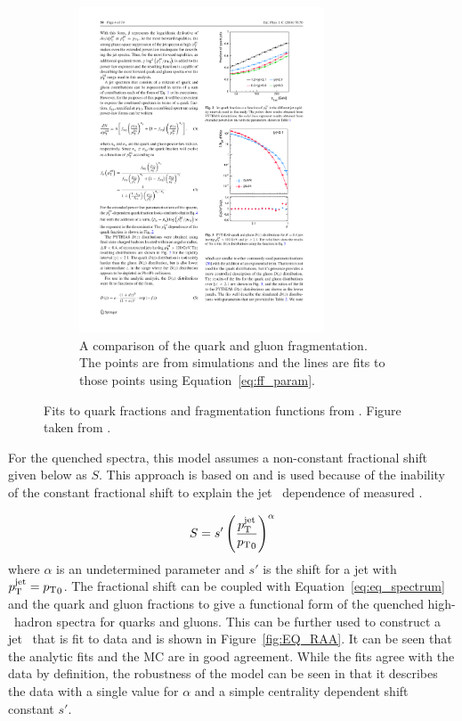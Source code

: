 \begin{figure}
\begin{subfigure}{.45\textwidth}
\includegraphics[width=0.8\textwidth]{figures/jetMeasurements/gluon_fragmentation}
\caption{A comparison of the quark and gluon fragmentation.
The points are from  simulations and the lines are fits to those points using Equation~\ref{eq:ff_param}.}
\label{fig:gluon_fragmentation}
\end{subfigure}
\caption{Fits to quark fractions and fragmentation functions from .
 Figure taken from \cite{Spousta:2015fca}.}
\label{fig:EQ_pp_models}
\end{figure}

For the quenched spectra, this model assumes a non-constant fractional shift given below as $S$.
This approach is based on \cite{baier2001quenching} and is used because of the inability of the constant fractional shift to explain the jet \pt\ dependence of measured \RAA.

\begin{align}
S = s' \left( \frac{\mbox{$p_{\mathrm{T}}^{\mathrm{jet}}$}}{\mbox{$p_{\mathrm{T}}$}_0} \right) ^\alpha
\end{align}
where $\alpha$ is an undetermined parameter and $s'$ is the shift for a jet with $\mbox{$p_{\mathrm{T}}^{\mathrm{jet}}$} = \mbox{$p_{\mathrm{T}}$}_0$.
The fractional shift can be coupled with Equation~\ref{eq:eq_spectrum} and the quark and gluon fractions to give a functional form of the quenched high-\pt\ hadron spectra for quarks and gluons.
This can be further used to construct a jet \RAA\ that is fit to data and is shown in Figure~\ref{fig:EQ_RAA}.
It can be seen that the analytic fits and the MC are in good agreement.
While the fits agree with the data by definition, the robustness of the model can be seen in that it describes the data with a single value for $\alpha$ and a simple centrality dependent shift constant $s'$.


